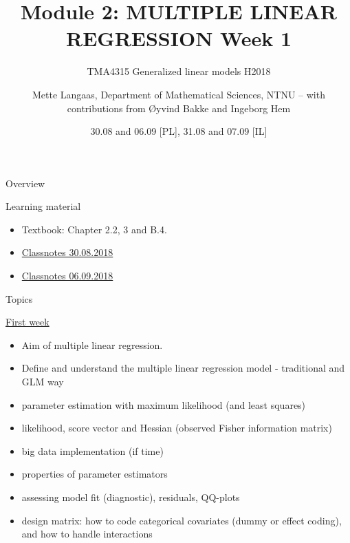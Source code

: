 \documentclass[
  ignorenonframetext,
]{beamer}
\title{\texorpdfstring{Module 2: MULTIPLE LINEAR REGRESSION Week
1}{Module 2: MULTIPLE LINEAR REGRESSION Week 1}}
\subtitle{\texorpdfstring{TMA4315 Generalized linear models
H2018}{TMA4315 Generalized linear models H2018}}
\author{\texorpdfstring{Mette Langaas, Department of Mathematical
Sciences, NTNU -- with contributions from Øyvind Bakke and Ingeborg
Hem}{Mette Langaas, Department of Mathematical Sciences, NTNU -- with contributions from Øyvind Bakke and Ingeborg Hem}}
\date{30.08 and 06.09 {[}PL{]}, 31.08 and 07.09 {[}IL{]}}
\providecommand{\tightlist}{%
  \setlength{\itemsep}{0pt}\setlength{\parskip}{0pt}}
\begin{document}
\frame{\titlepage}

\begin{frame}{Overview}
\protect{}\label{overview}
\begin{block}{Learning material}
\protect{}\label{learning-material}
\begin{itemize}
\tightlist
\item
  Textbook: Chapter 2.2, 3 and B.4.
\item
  \href{https://www.math.ntnu.no/emner/TMA4315/2018h/TMA4315M2H20180830.pdf}{Classnotes
  30.08.2018}
\item
  \href{https://www.math.ntnu.no/emner/TMA4315/2018h/TMA4315M2H20180906.pdf}{Classnotes
  06.09.2018}
\end{itemize}
\end{block}
\end{frame}

\begin{frame}
\begin{block}{Topics}
\protect{}\label{topics}
\begin{block}{\hyperlink{firstweek}{First week}}
\protect{}\label{first-week}
\begin{itemize}
\tightlist
\item
  Aim of multiple linear regression.
\item
  Define and understand the multiple linear regression model -
  traditional and GLM way
\item
  parameter estimation with maximum likelihood (and least squares)
\item
  likelihood, score vector and Hessian (observed Fisher information
  matrix)
\item
  big data implementation (if time)
\item
  properties of parameter estimators
\item
  assessing model fit (diagnostic), residuals, QQ-plots
\item
  design matrix: how to code categorical covariates (dummy or effect
  coding), and how to handle interactions
\end{itemize}
\end{block}
\end{block}
\end{frame}
\end{document}
